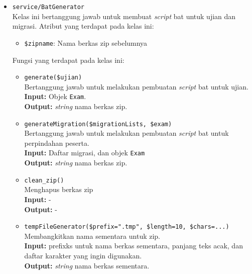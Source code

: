     \begin{itemize}
        \item \texttt{service/BatGenerator} \\
            Kelas ini bertanggung jawab untuk membuat \textit{script} bat untuk
            ujian dan migrasi. Atribut yang terdapat pada kelas ini:
            \begin{itemize}
                \item \texttt{\$zipname}: Nama berkas zip sebelumnya
            \end{itemize}
            Fungsi yang terdapat pada kelas ini:
            \begin{itemize}
                \item \texttt{generate(\$ujian)} \\
                    Bertanggung jawab untuk melakukan pembuatan \textit{script}
                    bat untuk ujian. \\
                    \textbf{Input:} Objek \texttt{Exam}.\\
                    \textbf{Output:} \textit{string} nama berkas zip.
                
                \item \texttt{generateMigration(\$migrationLists, \$exam)} \\
                    Bertanggung jawab untuk melakukan pembuatan \textit{script}
                    bat untuk perpindahan peserta.\\
                    \textbf{Input:} Daftar migrasi, dan objek \texttt{Exam}\\
                    \textbf{Output:} \textit{string} nama berkas zip.
                
                \item \texttt{clean\_zip()} \\
                    Menghapus berkas zip \\
                    \textbf{Input:} -\\
                    \textbf{Output:} -
                
                \item \texttt{tempFileGenerator(\$prefix=".tmp", \$length=10,
                \$chars=...)} \\
                    Membangkitkan nama sementara untuk zip. \\
                    \textbf{Input:} prefixks untuk nama berkas sementara,
                        panjang teks acak, dan daftar karakter yang ingin
                        digunakan.\\
                    \textbf{Output:} \textit{string} nama berkas sementara.
            \end{itemize}
        

\end{itemize}
